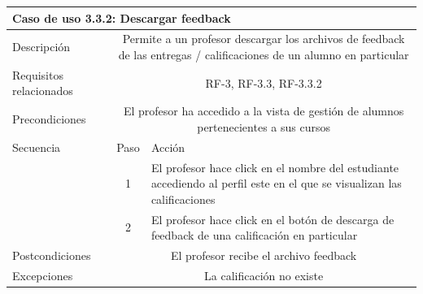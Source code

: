 \begin{tabular}[H]{l c l}
\toprule 
\multicolumn{3}{l}{\textbf{Caso de uso 3.3.2: Descargar feedback}}\\
\midrule
Descripción & \multicolumn{2}{p{10cm}}{Permite a un profesor descargar los archivos de feedback de las entregas / calificaciones de un alumno en particular}\\
\midrule
Requisitos relacionados & \multicolumn{2}{p{10cm}}{RF-3, RF-3.3, RF-3.3.2}\\
\midrule
Precondiciones & \multicolumn{2}{p{10cm}}{El profesor ha accedido a la vista de gestión de alumnos pertenecientes a sus cursos}\\
\midrule
Secuencia & Paso & Acción \\
\cmidrule{2-3}
         & 1 &  \multicolumn{1}{p{8cm}}{El profesor hace click en el nombre del estudiante accediendo al perfil este en el que se visualizan las calificaciones}\\
         & 2 &  \multicolumn{1}{p{8cm}}{El profesor hace click en el botón de descarga de feedback de una calificación en particular}\\

\midrule
Postcondiciones & \multicolumn{2}{p{10cm}}{El profesor recibe el archivo feedback}\\
\midrule
Excepciones & \multicolumn{2}{p{10cm}}{La calificación no existe}\\
\bottomrule 
\end{tabular}

\hspace{3cm}

